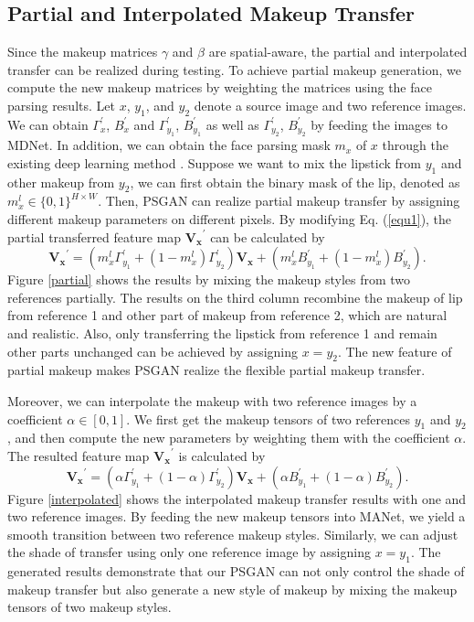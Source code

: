 \subsection{Partial and Interpolated Makeup Transfer}
Since the makeup matrices $\gamma$ and $\beta$ are spatial-aware, the partial and interpolated transfer can be realized during testing.
To achieve partial makeup generation, we compute the new makeup matrices by weighting the matrices using the face parsing results.
Let $x$, $y_1$, and $y_2$ denote a source image and two reference images. We can obtain $\Gamma^{\prime}_x$, $B^{\prime}_x$ and $\Gamma^{\prime}_{y_1}$, $B^{\prime}_{y_1}$ as well as $\Gamma^{\prime}_{y_2}$, $B^{\prime}_{y_2}$ by feeding the images to MDNet.
In addition, we can obtain the face parsing mask $m_x$ of $x$ through the existing deep learning method \cite{Zhao2016PyramidSP}.
Suppose we want to mix the lipstick from $y_1$ and other makeup from $y_2$, we can first obtain the binary mask of the lip, denoted as $m^{l}_x \in \{0, 1\}^{H \times W}$.
Then, PSGAN can realize partial makeup transfer by assigning different makeup parameters on different pixels.
By modifying Eq. (\ref{equ1}), the partial transferred feature map $\mathbf{V_x}^{\prime}$ can be calculated by
    \begin{equation}
        \mathbf{V_x}^{\prime} = (m^{l}_x \Gamma^{\prime}_{y_1} + (1-m^{l}_x)\Gamma^{\prime}_{y_2}) \mathbf{V_x}  + (m^{l}_x B^{\prime}_{y_1}  + (1-m^{l}_x) B^{\prime}_{y_2}).
        \label{equ2}
        \end{equation}
Figure \ref{partial} shows the results by mixing the makeup styles from two references partially. The results on the third column recombine the makeup of lip from reference 1 and other part of makeup from reference 2, which are natural and realistic. Also, only transferring the lipstick from reference 1 and remain other parts unchanged can be achieved by assigning $x = y_2$. The new feature of partial makeup makes PSGAN realize the flexible partial makeup transfer.

Moreover, we can interpolate the makeup with two reference images by a coefficient $\alpha \in [0,1]$. We first get the makeup tensors of two references $y_1$ and $y_2$, and then compute the new parameters by weighting them  with the coefficient $\alpha$. The resulted feature map $\mathbf{V_x}^{\prime}$ is calculated by
\begin{equation}
\mathbf{V_x}^{\prime} = (\alpha \Gamma^{\prime}_{y_1} + (1-\alpha)\Gamma^{\prime}_{y_2}) \mathbf{V_x}  + (\alpha B^{\prime}_{y_1} + (1-\alpha) B^{\prime}_{y_2}).
\label{equ3}
\end{equation}
Figure \ref{interpolated} shows the interpolated makeup transfer results with one and two reference images. By feeding the new makeup tensors into MANet, we yield a smooth transition between two reference makeup styles. Similarly, we can adjust the shade of transfer using only one reference image by assigning $x = y_1$.
The generated results demonstrate that our PSGAN can not only control the shade of makeup transfer but also generate a new style of makeup by mixing the makeup tensors of two makeup styles.


